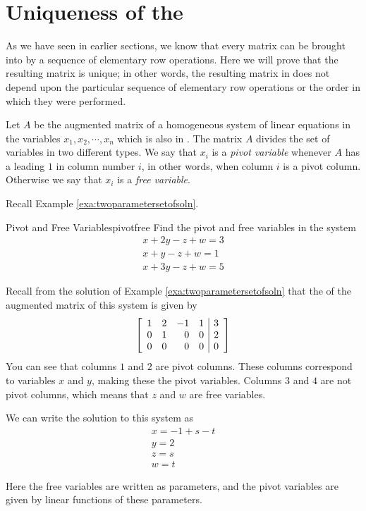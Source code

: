 \section{Uniqueness of the {\RREF}}

As we have seen in earlier sections, we know that every matrix can be brought into {\rref} by a sequence of elementary row operations. Here we will prove that the resulting matrix is unique; in other words, the resulting matrix in {\rref} does not depend upon the particular sequence of elementary row operations or the order in which they were performed. 

Let $A$ be the augmented matrix of a homogeneous system of linear
equations in the variables $x_1, x_2, \cdots, x_n$ which is also in
{\rref}. The matrix $A$ divides the set of variables in two different
types. We say that $x_i$ is a {\em pivot variable}     whenever $A$ has
a leading $1$ in column number $i$, in other words, when column $i$ is
a pivot column. Otherwise we say that $x_i$ is a {\em free
variable\em}. 

Recall Example \ref{exa:twoparametersetofsoln}.

\begin{example}{Pivot and Free Variables}{pivotfree}
Find the pivot and free variables in the system
\[
\begin{array}{c}
x+2y-z+w=3 \\
x+y-z+w=1 \\
x+3y-z+w=5
\end{array}
\]
\end{example}

\begin{solution}
Recall from the solution of Example \ref{exa:twoparametersetofsoln} that the {\ef} of the augmented matrix of this system is given by
\[
\left[
\begin{array}{rrrr|r}
1 & 2 & -1 & 1 & 3 \\
0 & 1 & 0 & 0 & 2 \\
0 & 0 & 0 & 0 & 0
\end{array}
\right]  
\]
You can see that columns $1$ and $2$ are pivot columns. These columns correspond to variables $x$ and $y$, making these the pivot variables. Columns $3$ and $4$ are not pivot columns, which means that $z$ and $w$ are free variables.

We can write the solution to this system as 
\[
\begin{array}{c}
x=-1+s-t \\
y=2 \\
z=s \\
w=t
\end{array}
\]

Here the free variables are written as parameters, and the pivot variables are given by linear functions of these parameters. 
\end{solution}

